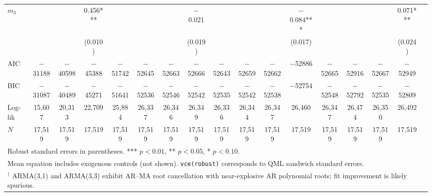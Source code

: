 \begin{table}[!htbp]
{\begin{tabular}{lcccccccccccccccc}
$m_{3}$ &  &  & 0.456*** &  &  &  & $-$0.021 &  &  &  & $-$0.084*** &  &  &  & 0.071*** \\
        &  &  & (0.010)  &  &  &  & (0.019)  &  &  &  & (0.017)     &  &  &  & (0.024)  \\
\midrule
AIC     & $-$31188 & $-$40598 & $-$45388 & $-$51742 & $-$52645 & $-$52663 & $-$52666 & $-$52643 & $-$52659 & $-$52662 & $-$52886 & $-$52665 & $-$52916 & $-$52667 & $-$52949 \\
BIC     & $-$31087 & $-$40489 & $-$45271 & $-$51641 & $-$52536 & $-$52546 & $-$52542 & $-$52535 & $-$52542 & $-$52538 & $-$52754 & $-$52548 & $-$52792 & $-$52535 & $-$52809 \\
Log-lik & 15{,}607 & 20{,}313 & 22{,}709 & 25{,}884 & 26{,}337 & 26{,}346 & 26{,}349 & 26{,}336 & 26{,}344 & 26{,}347 & 26{,}460 & 26{,}347 & 26{,}474 & 26{,}350 & 26{,}492 \\
$N$     & 17{,}519 & 17{,}519 & 17{,}519 & 17{,}519 & 17{,}519 & 17{,}519 & 17{,}519 & 17{,}519 & 17{,}519 & 17{,}519 & 17{,}519 & 17{,}519 & 17{,}519 & 17{,}519 & 17{,}519 \\
\bottomrule
\multicolumn{16}{l}{\footnotesize Robust standard errors in parentheses. *** $p<0.01$, ** $p<0.05$, * $p<0.10$.} \\
\multicolumn{16}{l}{\footnotesize Mean equation includes exogenous controls (not shown). \texttt{vce(robust)} corresponds to QML sandwich standard errors.} \\
\multicolumn{16}{l}{\footnotesize $^\dagger$ ARMA(3,1) and ARMA(3,3) exhibit AR--MA root cancellation with near-explosive AR polynomial roots; fit improvement is likely spurious.} \\
\end{tabular}%
}
\end{table}

